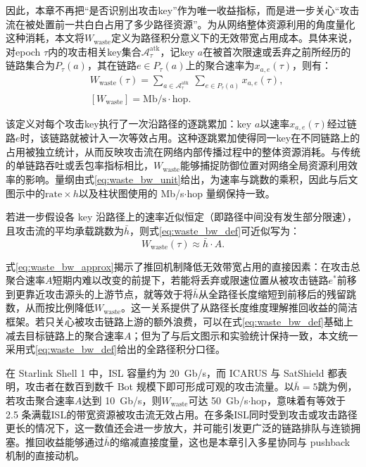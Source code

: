 因此，本章不再把“是否识别出攻击key”作为唯一收益指标，而是进一步关心“攻击流在被处置前一共白白占用了多少路径资源”。为从网络整体资源利用的角度量化这种消耗，本文将$W_{\text{waste}}$定义为路径积分意义下的无效带宽占用成本。具体来说，对epoch $\tau$内的攻击相关key集合$\mathcal{A}^{\text{atk}}_\tau$，记key $a$在被首次限速或丢弃之前所经历的链路集合为$P_\tau(a)$，其在链路$e\in P_\tau(a)$上的聚合速率为$x_{a,e}(\tau)$，则有：
\begin{subequations}\label{eq:waste_bw}
\begin{align}
&W_{\text{waste}}(\tau)=\sum_{a\in\mathcal{A}^{\text{atk}}_\tau}\ \sum_{e\in P_\tau(a)} x_{a,e}(\tau),
\label{eq:waste_bw_def}\\[0.35em]
&[W_{\text{waste}}]=\text{Mb/s}\cdot\text{hop}.
\label{eq:waste_bw_unit}
\end{align}
\end{subequations}

该定义对每个攻击key执行了一次沿路径的逐跳累加：key $a$以速率$x_{a,e}(\tau)$经过链路$e$时，该链路就被计入一次等效占用。这种逐跳累加使得同一key在不同链路上的占用被独立统计，从而反映攻击流在网络内部传播过程中的整体资源消耗。与传统的单链路吞吐或丢包率指标相比，$W_{\text{waste}}$能够捕捉防御位置对网络全局资源利用效率的影响。量纲由式\eqref{eq:waste_bw_unit}给出，为速率与跳数的乘积，因此与后文图示中的$\text{rate}\times h$以及柱状图使用的 Mb/s$\cdot$hop 量纲保持一致。

若进一步假设各 key 沿路径上的速率近似恒定（即路径中间没有发生部分限速），且攻击流的平均承载跳数为$\bar h$，则式\eqref{eq:waste_bw_def}可近似写为：
\begin{equation}
W_{\text{waste}}(\tau) \approx \bar h\cdot A.
\label{eq:waste_bw_approx}
\end{equation}

式\eqref{eq:waste_bw_approx}揭示了推回机制降低无效带宽占用的直接因素：在攻击总聚合速率$A$短期内难以改变的前提下，若能将丢弃或限速位置从被攻击链路$e^\ast$前移到更靠近攻击源头的上游节点，就等效于将$\bar h$从全路径长度缩短到前移后的残留跳数，从而按比例降低$W_{\text{waste}}$。这一关系提供了从路径长度维度理解推回收益的简洁框架。若只关心被攻击链路上游的额外浪费，可以在式\eqref{eq:waste_bw_def}基础上减去目标链路上的聚合速率$A$；但为了与后文图示和实验统计保持一致，本文统一采用式\eqref{eq:waste_bw_def}给出的全路径积分口径。

在 Starlink Shell 1 中，ISL 容量约为 20~Gb/s，而 ICARUS 与 SatShield 都表明，攻击者在数百到数千 Bot 规模下即可形成可观的攻击流量。以$\bar h = 5$跳为例，若攻击聚合速率$A$达到 10~Gb/s，则$W_{\text{waste}}$可达 50~Gb/s$\cdot$hop，意味着有等效于 2.5 条满载ISL的带宽资源被攻击流无效占用。在多条ISL同时受到攻击或攻击路径更长的情况下，这一数值还会进一步放大，并可能引发更广泛的链路排队与连锁拥塞。推回收益能够通过$\bar h$的缩减直接度量，这也是本章引入多星协同与 pushback 机制的直接动机。

